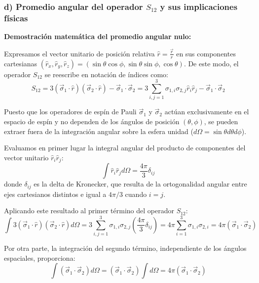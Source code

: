 \begin{problema}
\newpage

\subsubsection*{d) Promedio angular del operador $S_{12}$ y sus implicaciones físicas}

\textbf{Demostración matemática del promedio angular nulo:}

Expresamos el vector unitario de posición relativa $\hat{r} = \frac{\vec{r}}{r}$ en sus componentes cartesianas $(\hat{r}_x, \hat{r}_y, \hat{r}_z) = (\sin\theta\cos\phi, \sin\theta\sin\phi, \cos\theta)$. De este modo, el operador $S_{12}$ se reescribe en notación de índices como:
\begin{equation}
S_{12} = 3 (\vec{\sigma}_1 \cdot \hat{r})(\vec{\sigma}_2 \cdot \hat{r}) - \vec{\sigma}_1 \cdot \vec{\sigma}_2 = 3 \sum_{i,j=1}^3 \sigma_{1,i} \sigma_{2,j} \hat{r}_i \hat{r}_j - \vec{\sigma}_1 \cdot \vec{\sigma}_2
\end{equation}

Puesto que los operadores de espín de Pauli $\vec{\sigma}_1$ y $\vec{\sigma}_2$ actúan exclusivamente en el espacio de espín y no dependen de los ángulos de posición $(\theta, \phi)$, se pueden extraer fuera de la integración angular sobre la esfera unidad ($d\Omega = \sin\theta d\theta d\phi$). 

Evaluamos en primer lugar la integral angular del producto de componentes del vector unitario $\hat{r}_i \hat{r}_j$:
\begin{equation}
\int \hat{r}_i \hat{r}_j d\Omega = \frac{4\pi}{3} \delta_{ij}
\end{equation}
donde $\delta_{ij}$ es la delta de Kronecker, que resulta de la ortogonalidad angular entre ejes cartesianos distintos e igual a $4\pi/3$ cuando $i = j$.

Aplicando este resultado al primer término del operador $S_{12}$:
\begin{equation}
\int 3 (\vec{\sigma}_1 \cdot \hat{r})(\vec{\sigma}_2 \cdot \hat{r}) d\Omega = 3 \sum_{i,j=1}^3 \sigma_{1,i} \sigma_{2,j} \left( \frac{4\pi}{3} \delta_{ij} \right) = 4\pi \sum_{i=1}^3 \sigma_{1,i} \sigma_{2,i} = 4\pi (\vec{\sigma}_1 \cdot \vec{\sigma}_2)
\end{equation}

Por otra parte, la integración del segundo término, independiente de los ángulos espaciales, proporciona:
\begin{equation}
\int (\vec{\sigma}_1 \cdot \vec{\sigma}_2) d\Omega = (\vec{\sigma}_1 \cdot \vec{\sigma}_2) \int d\Omega = 4\pi (\vec{\sigma}_1 \cdot \vec{\sigma}_2)
\end{equation}


\end{problema}
